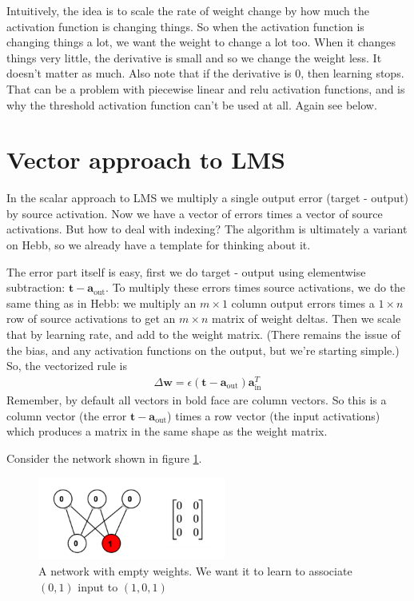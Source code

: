 Intuitively, the idea is to scale the rate of weight change by how much the activation function is changing things. So when the activation function is changing things a lot, we want the weight to change a lot too. When it changes things very little, the derivative is small and so we change the weight less.  It doesn't matter as much.  Also note that if the derivative is 0, then learning stops. That can be a problem with piecewise linear and relu activation functions, and is why the threshold activation function can't be used at all.  Again see below.

\section{Vector approach to LMS}


In the scalar approach to LMS we multiply a single output error (target - output) by source activation. Now we have a vector of errors times a vector of source activations. But how to deal with indexing?  The algorithm is ultimately a variant on Hebb, so we already have a template for thinking about it.

The error part itself is easy, first we do target - output using elementwise subtraction: $\mathbf{t} - \mathbf{a}_{\text{out}}$.  To multiply these errors times source activations, we do the same thing as in Hebb: we multiply an $m \times  1$ column output errors times a $1 \times  n$ row of source activations to get an $m \times n$ matrix of weight deltas.  Then we scale that by learning rate, and add to the weight matrix.  (There remains the issue of the bias, and any activation functions on the output, but we're starting simple.) So, the vectorized rule is
\begin{eqnarray*}
\Delta \mathbf{w}  =  \epsilon (\mathbf{t} - \mathbf{a}_{\text{out}}) \mathbf{a}_{\text{in}}^T
\end{eqnarray*}
Remember, by default all vectors in bold face are column vectors.  So this is a column vector (the error $\mathbf{t} - \mathbf{a}_{\text{out}}$) times a row vector (the input activations) which produces a matrix in the same shape as the weight matrix.

Consider the network shown in figure \ref{lms_vector_pre}.

\begin{figure}[h]
\centering
\includegraphics[width=0.55\textwidth]{images/vectorLMSBeforeTrain.png}
\caption[Jeff Yoshimi.]{A network with empty weights. We want it to learn to associate $(0,1)$ input to $(1,0,1)$}
\label{lms_vector_pre}
\end{figure}

